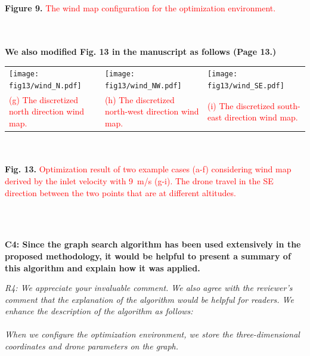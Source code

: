 \documentclass[onecolumn]{IEEEconf}
\begin{document}
\begin{description}
\begin{mdframed}[ linewidth=.75pt, userdefinedwidth=0.9\textwidth]
\begin{tabular}{m{}m{}}
    \end{tabular}
    \\~\\
    \textbf{Figure 9.} \textcolor{red}{The wind map configuration for the optimization environment.}
    \label{fig: wind_map}
 \end{mdframed}     
    ~\\
    ~\pagebreak ~
    ~\\
    \textbf{We also modified Fig. 13 in the manuscript as follows (Page 13.)}\\
    \begin{mdframed}[ linewidth=.75pt, userdefinedwidth=0.9\textwidth]
    \begin{tabular}{m{}m{}m{}}
    \texttt{[image: fig13/wind\_N.pdf]}&
    \texttt{[image: fig13/wind\_NW.pdf]}&
    \texttt{[image: fig13/wind\_SE.pdf]}\\
    \small \textcolor{red}{(g) The discretized north direction wind map.} &
    \small \textcolor{red}{(h) The discretized north-west direction wind map.} &
    \small \textcolor{red}{(i) The discretized south-east direction wind map.} \\
    \end{tabular}
    ~\\
    ~\\
    \textbf{Fig. 13.} \textcolor{red}{Optimization result of two example cases (a-f) considering wind map derived by the inlet velocity with 9~m/s (g-i). 
    The drone travel in the SE direction between the two points that are at different altitudes.}
    \label{fig: wind_opt}
 \end{mdframed}       
	~\\
	~\\
    \item \textbf
    {
	C4: Since the graph search algorithm has been used extensively in the proposed methodology, it would be helpful to present a summary of this algorithm and explain how it was applied. 
	}
	\item \textit
	{
	R4: We appreciate your invaluable comment. We also agree with the reviewer's comment that the explanation of the algorithm would be helpful for readers. We enhance the description of the algorithm as follows: 
	~\\
	~\\
	When we configure the optimization environment, we store the three-dimensional coordinates and drone parameters on the graph. 
}
\end{description}
\end{document}
